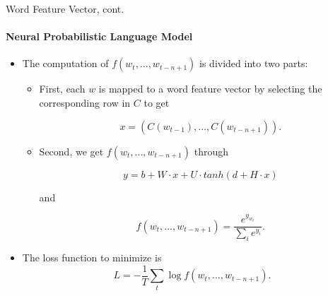 \documentclass{beamer}
\begin{document}
\begin{frame}{Word Feature Vector, cont.}\framesubtitle{Neural Probabilistic Language Model}
    \begin{itemize}
        \item The computation of $f(w_t, ..., w_{t-n+1})$ is divided into two parts:
            \begin{itemize}
                \item First, each $w$ is mapped to a word feature vector by selecting the corresponding row in $C$ to get

                $$x=(C(w_{t-1}),... ,C(w_{t-n+1})).$$

                \item Second, we get $f(w_t, ..., w_{t-n+1})$ through

                $$y=b+W\cdot x + U\cdot tanh(d + H\cdot x)$$

                and

                $$ f(w_t, ..., w_{t-n+1}) = \frac{e^{y_{w_t}}}{\sum_{i}^{}e^{y_i}}.$$
            \end{itemize}
        \item The loss function to minimize is $$L = -\frac{1}{T}\sum _{t}^{} \log{f(w_t, ..., w_{t-n+1})}.$$
    \end{itemize}
\end{frame}
\end{document}
